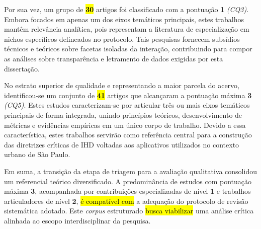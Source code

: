 \documentclass[
	12pt,				%
	oneside,			%
	a4paper,			%
	english,			%
	brazil				%
	]{abntex2ppgsi}
\begin{document}
    Por sua vez, um grupo de \hl{\textbf{30}} artigos foi classificado com a pontuação \textbf{1} \textit{(CQ3)}. Embora focados em apenas um dos eixos temáticos principais, estes trabalhos mantêm relevância analítica, pois representam a literatura de especialização em nichos específicos delineados no protocolo. Tais pesquisas fornecem subsídios técnicos e teóricos sobre facetas isoladas da interação, contribuindo para compor as análises sobre transparência e letramento de dados exigidas por esta dissertação.

    No estrato superior de qualidade e representando a maior parcela do acervo, identificou-se um conjunto de \hl{\textbf{41}} artigos que alcançaram a pontuação máxima \textbf{3} \textit{(CQ5)}. Estes estudos caracterizam-se por articular três ou mais eixos temáticos principais de forma integrada, unindo princípios teóricos, desenvolvimento de métricas e evidências empíricas em um único corpo de trabalho. Devido a essa característica, estes trabalhos servirão como referência central para a construção das diretrizes críticas de IHD voltadas aos aplicativos utilizados no contexto urbano de São Paulo.

    Em suma, a transição da etapa de triagem para a avaliação qualitativa consolidou um referencial teórico diversificado. A predominância de estudos com pontuação máxima \textbf{3}, acompanhada por contribuições especializadas de nível \textbf{1} e trabalhos articuladores de nível \textbf{2}, \hl{é compatível com} a adequação do protocolo de revisão sistemática adotado. Este \textit{corpus} estruturado \hl{busca viabilizar} uma análise crítica alinhada ao escopo interdisciplinar da pesquisa.
    
\end{document}
